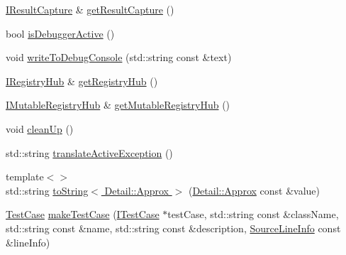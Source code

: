 \begin{DoxyCompactItemize}
\item 
\hyperlink{structCatch_1_1IResultCapture}{I\-Result\-Capture} \& \hyperlink{namespaceCatch_aff60c1de6ac6cea30175d70e33d83c8e}{get\-Result\-Capture} ()
\item 
bool \hyperlink{namespaceCatch_ab079497368fb1df25af39ad494d2a241}{is\-Debugger\-Active} ()
\item 
void \hyperlink{namespaceCatch_aa5dcf4750ce9a854f4b74d3c952d13cc}{write\-To\-Debug\-Console} (std\-::string const \&text)
\item 
\hyperlink{structCatch_1_1IRegistryHub}{I\-Registry\-Hub} \& \hyperlink{namespaceCatch_ac24b072979540bfd922e7d46e899f46f}{get\-Registry\-Hub} ()
\item 
\hyperlink{structCatch_1_1IMutableRegistryHub}{I\-Mutable\-Registry\-Hub} \& \hyperlink{namespaceCatch_ac9ddcc6d66079add9cb2a3140b8ae51e}{get\-Mutable\-Registry\-Hub} ()
\item 
void \hyperlink{namespaceCatch_a0f78e9afdebc6d4512d18e76fbf54b8c}{clean\-Up} ()
\item 
std\-::string \hyperlink{namespaceCatch_adafff91485eeeeb9e9333f317cc0e3b1}{translate\-Active\-Exception} ()
\item 
{\footnotesize template$<$$>$ }\\std\-::string \hyperlink{namespaceCatch_ac501c2b6bfe82978d699ddda37c53d13}{to\-String$<$ Detail\-::\-Approx $>$} (\hyperlink{classCatch_1_1Detail_1_1Approx}{Detail\-::\-Approx} const \&value)
\item 
\hyperlink{classCatch_1_1TestCase}{Test\-Case} \hyperlink{namespaceCatch_a2a784590bb5068810d3f6013fed1f1d3}{make\-Test\-Case} (\hyperlink{structCatch_1_1ITestCase}{I\-Test\-Case} $\ast$test\-Case, std\-::string const \&class\-Name, std\-::string const \&name, std\-::string const \&description, \hyperlink{structCatch_1_1SourceLineInfo}{Source\-Line\-Info} const \&line\-Info)
\end{DoxyCompactItemize}


